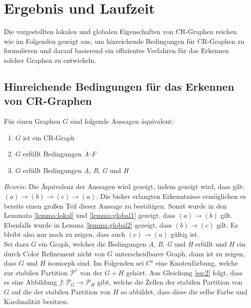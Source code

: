 \section{Ergebnis und Laufzeit}
\label{sec/ergebnis}


Die vorgestellten lokalen und globalen Eigenschaften von CR-Graphen reichen wie im Folgenden gezeigt aus, um hinreichende Bedingungen für CR-Graphen zu formulieren und darauf basierend ein effizientes Verfahren für das Erkennen solcher Graphen zu entwickeln.

\subsection{Hinreichende Bedingungen für das Erkennen von CR-Graphen}
\begin{Theorem}
	Für einen Graphen $G$ sind folgende Aussagen äquivalent:
	
	\begin{enumerate}[label=(\alph*)]
		\item $G$ ist ein CR-Graph
		\item $G$ erfüllt Bedingungen \emph{A-F}
		\item $G$ erfüllt Bedingungen \emph{A}, \emph{B}, \emph{G} und \emph{H}
	\end{enumerate}
\end{Theorem}

\emph{Beweis:} Die Äquivalenz der Aussagen wird gezeigt, indem gezeigt wird, dass gilt: $(a)\rightarrow (b)\rightarrow (c)\rightarrow (a)$.
Die bisher erlangten Erkenntnisse ermöglichen es bereits einen großen Teil dieser Aussage zu bestätigen. Somit wurde in den Lemmata \ref{lemma:lokal} und \ref{lemma:global1} gezeigt, dass $(a)\rightarrow (b)$ gilt. Ebenfalls wurde in Lemma \ref{lemma:global2} gezeigt, dass $(b)\rightarrow (c)$ gilt. Es bleibt also nur noch zu zeigen, dass auch $(c)\rightarrow (a)$ gültig ist.\\

Sei dazu $G$ ein Graph, welcher die Bedingungen \emph{A}, \emph{B}, \emph{G} und \emph{H} erfüllt und $H$ ein durch Color Refinement nicht von $G$ unterscheidbarer Graph, dann ist zu zeigen, dass $G$ und $H$ isomorph sind.
Im Folgenden sei $C^s$ eine Knotenfärbung, welche zur stabilen Partition $\mathcal{P}^s$ von der  $G+H$ gehört.
Aus Gleichung \ref{eq:2} folgt, dass es eine Abbildung $f:\mathcal{P}_G\rightarrow \mathcal{P}_H$ gibt, welche die Zellen der stabilen Partition von $G$ auf die der stabilen Partition von $H$ so abbildet, dass diese die selbe Farbe und Kardinalität besitzen.

